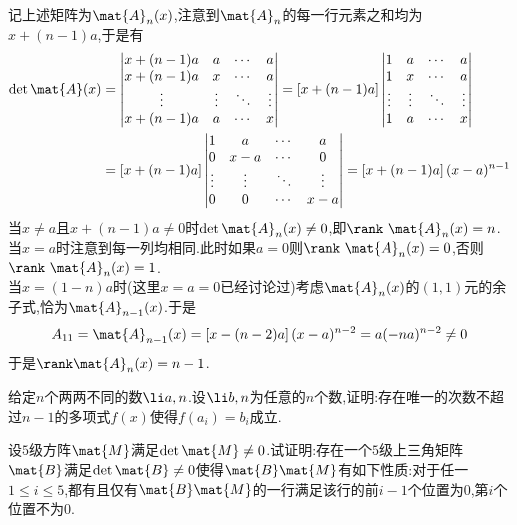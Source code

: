 \documentclass{ctexart}
\begin{document}
\begin{solution}
    记上述矩阵为$\mat{A}_n(x)$,注意到$\mat{A}_n$的每一行元素之和均为$x+(n-1)a$,于是有
    \[\begin{aligned}
        \det\mat{A}(x)
    &=\begin{vmatrix}
        x+(n-1)a&a&\cdots&a\\
        x+(n-1)a&x&\cdots&a\\
        \vdots&\vdots&\ddots&\vdots\\
        x+(n-1)a&a&\cdots&x
    \end{vmatrix}
    =\left[x+(n-1)a\right]\begin{vmatrix}
        1&a&\cdots&a\\
        1&x&\cdots&a\\
        \vdots&\vdots&\ddots&\vdots\\
        1&a&\cdots&x
    \end{vmatrix}\\
    &=\left[x+(n-1)a\right]\begin{vmatrix}
        1&a&\cdots&a\\
        0&x-a&\cdots&0\\
        \vdots&\vdots&\ddots&\vdots\\
        0&0&\cdots&x-a
    \end{vmatrix}=\left[x+(n-1)a\right](x-a)^{n-1}
    \end{aligned}\]
    当$x\neq a$且$x+(n-1)a\neq0$时$\det\mat{A}_n(x)\neq0$,即$\rank\ \mat{A}_n(x)=n$.\\
    当$x=a$时注意到每一列均相同.此时如果$a=0$则$\rank\ \mat{A}_n(x)=0$,否则$\rank\ \mat{A}_n(x)=1$.\\
    当$x=(1-n)a$时(这里$x=a=0$已经讨论过)考虑$\mat{A}_n(x)$的$(1,1)$元的余子式,恰为$\mat{A}_{n-1}(x)$.于是
    \[A_{11}=\mat{A}_{n-1}(x)=\left[x-(n-2)a\right](x-a)^{n-2}=a(-na)^{n-2}\neq0\]
    于是$\rank\mat{A}_n(x)=n-1$.
\end{solution}
\begin{homework}[7(10')]
    给定$n$个两两不同的数$\li a,n$.设$\li b,n$为任意的$n$个数,证明:存在唯一的次数不超过$n-1$的多项式$f(x)$使得$f\left(a_i\right)=b_i$成立.
\end{homework}
\begin{homework}[8(10')]
    设$5$级方阵$\mat{M}$满足$\det\mat{M}\neq0$.试证明:存在一个$5$级上三角矩阵$\mat{B}$满足$\det\mat{B}\neq0$使得$\mat{B}\mat{M}$有如下性质:对于任一$1\leqslant i\leqslant 5$,都有且仅有$\mat{B}\mat{M}$的一行满足该行的前$i-1$个位置为$0$,第$i$个位置不为$0$.
\end{homework}
\end{document}
